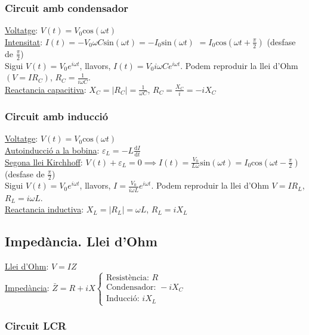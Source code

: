 \documentclass[12pt]{article}
\begin{document}
\begin{multicols}{2}
\subsubsection*{Circuit amb condensador}
\underline{Voltatge}: $V(t) = V_0\text{cos}(\omega t)$ \\
\underline{Intensitat}: $I(t) = -V_0\omega C \text{sin}(\omega t) = -I_0\text{sin}(\omega t)$ $= I_0\text{cos}(\omega t + \frac{\pi}{2})$ (desfase de $\frac{\pi}{2}$) \\
Sigui $V(t) = V_0 e^{i\omega t}$, llavors, $I(t) = V_0i\omega Ce^{i\omega t}$. Podem reproduir la llei d'Ohm $(V=IR_C)$, $R_C = \frac{1}{i\omega C}$.\\
\underline{Reactancia capacitiva}: $X_C = \vert R_C\vert = \frac{1}{\omega C}$, $R_C = \frac{X_C}{i} = -iX_C$

\subsubsection*{Circuit amb inducció}
\underline{Voltatge}: $V(t) = V_0\text{cos}(\omega t)$ \\
\underline{Autoinducció a la bobina}: $\varepsilon_L = -L \frac{\text{d}I}{\text{d}t}$ \\
\underline{Segona llei Kirchhoff}: $V(t) + \varepsilon_L = 0 \implies I(t) = \frac{V_0}{L\omega}\text{sin}(\omega t) = I_0\text{cos}(\omega t - \frac{\pi}{2})$ (desfase de $\frac{\pi}{2}$) \\
Sigui $V(t) = V_0e^{i\omega t}$, llavors, $I = \frac{V_0}{i\omega L}e^{i\omega t}$. Podem reproduir la llei d'Ohm $V=IR_L$, $R_L=i\omega L$. \\
\underline{Reactancia inductiva}: $X_L = \vert R_L\vert = \omega L$, $R_L = iX_L$

\subsection*{Impedància. Llei d'Ohm}

\underline{Llei d'Ohm}: $V = IZ$ \\
\underline{Impedància}: $\bar{Z} = R + iX \begin{cases} \text{Resistència: } R \\ \text{Condensador: } -iX_C \\ \text{Inducció: } iX_L \end{cases}$

\subsubsection*{Circuit LCR}


\end{multicols}
\end{document}

